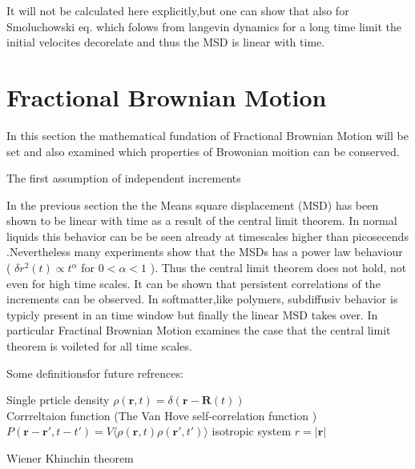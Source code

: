 \documentclass[
  a4paper,BCOR10mm,oneside,
  bibtotoc,idxtotoc,
  headsepline,footsepline,%
  fleqn,openbib
]{scrbook}
\begin{document}
It will not be calculated here explicitly,but one can show that also for Smoluchowski eq. which folows from langevin dynamics for a long time limit the initial velocites decorelate and thus the MSD is linear with time.



\section{Fractional Brownian Motion}

In this section the mathematical fundation of Fractional Brownian Motion will be set and also examined which properties of Browonian moition can be conserved.

The first assumption of independent increments 

In the previous section the the Means square displacement (MSD) has been shown to be linear with time as a result of the central limit theorem. In normal liquids this behavior can be be seen already at timescales higher than picosecends \cite{Hofling2013}.Nevertheless many experiments show that the MSDs has a power law behaviour ( $\delta r ^2 (t) \propto t^{\alpha}$ for  $0 < \alpha < 1$ ). Thus the central limit theorem does not hold, not even for high time scales. It can be shown that persistent correlations of the increments can be observed. In softmatter,like polymers, subdiffusiv behavior is typicly present in an time window but finally the linear MSD takes over. In particular Fractinal Brownian Motion examines the case that the central limit theorem is voileted for all time scales.  


Some definitionsfor future refrences:

Single prticle density $\rho(\bm{r},t)=\delta(\bm{r}-\bm{R}(t))$ \\

Corrreltaion function (The Van Hove self-correlation function 
) $P(\bm{r}-\bm{r}',t-t')= V\langle\rho(\bm{r},t) \rho(\bm{r}',t')\rangle$
isotropic system $ r= |\bm{r}|$


Wiener Khinchin theorem 
\end{document}
